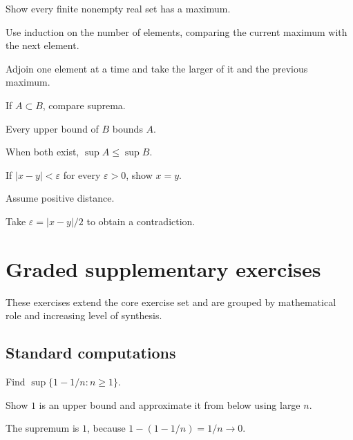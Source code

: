 \begin{exercise}\label{exr:ii01-06}
Show every finite nonempty real set has a maximum.
\end{exercise}
\begin{hint}
Use induction on the number of elements, comparing the current maximum with the next element.
\end{hint}
\begin{solution}
Adjoin one element at a time and take the larger of it and the previous maximum.
\end{solution}

\begin{exercise}\label{exr:ii01-07}
If $A\subset B$, compare suprema.
\end{exercise}
\begin{hint}
Every upper bound of $B$ bounds $A$.
\end{hint}
\begin{solution}
When both exist, $\sup A\le\sup B$.
\end{solution}

\begin{exercise}\label{exr:ii01-08}
If $|x-y|<\varepsilon$ for every $\varepsilon>0$, show $x=y$.
\end{exercise}
\begin{hint}
Assume positive distance.
\end{hint}
\begin{solution}
Take $\varepsilon=|x-y|/2$ to obtain a contradiction.
\end{solution}


\section{Graded supplementary exercises}
These exercises extend the core exercise set and are grouped by mathematical role and increasing level of synthesis.

\subsection*{Standard computations}

\begin{exercise}\label{exr:ii01-expand-01}
Find \(\sup\{1-1/n:n\ge1\}\).
\end{exercise}
\begin{hint}
Show \(1\) is an upper bound and approximate it from below using large \(n\).
\end{hint}
\begin{solution}
The supremum is \(1\), because \(1-(1-1/n)=1/n\to0\).
\end{solution}

